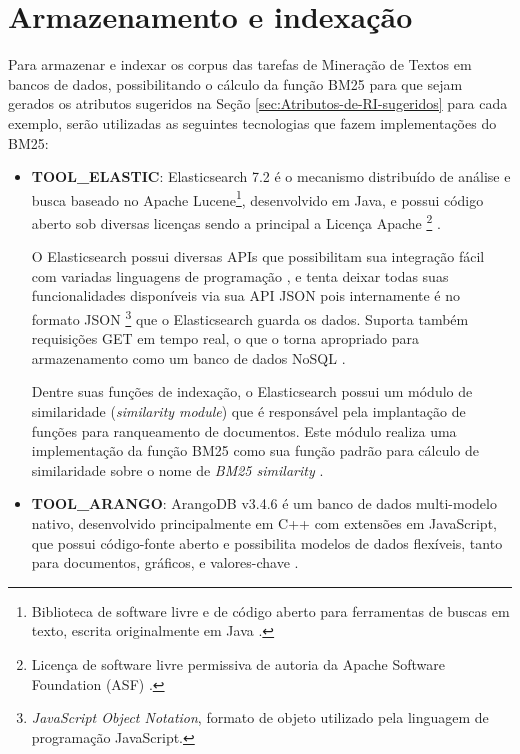     
\section{Armazenamento e indexação} \label{sec:Armazenamento-e-indexação}

    Para armazenar e indexar os corpus das tarefas de Mineração de Textos em bancos de dados, possibilitando o cálculo da função BM25 para que sejam gerados os atributos sugeridos na Seção \ref{sec:Atributos-de-RI-sugeridos} para cada exemplo, serão utilizadas as seguintes tecnologias que fazem implementações do BM25:
    \begin{itemize}
        \item \textbf{TOOL\_ELASTIC}: Elasticsearch 7.2 é o mecanismo distribuído de análise e busca baseado no Apache Lucene\footnote{Biblioteca de software livre e de código aberto para ferramentas de buscas em texto, escrita originalmente em Java \cite{LUCENE_DOCUMENTATION_2019}.}, desenvolvido em Java, e possui código aberto sob diversas licenças sendo a principal a Licença Apache
        \footnote{Licença de software livre permissiva de autoria da Apache Software Foundation (ASF) \cite{NEWMEDIA_OPENGUIDE_2015}.}
         \cite{ELASTIC_GitHub_2019, ELASTIC_REFERENCE_INTRO_2019}. 
        
        O Elasticsearch possui diversas APIs que possibilitam sua integração fácil com variadas linguagens de programação \cite{ELASTIC_GitHub_2019}, e tenta deixar todas suas funcionalidades disponíveis via sua API JSON pois internamente é no formato JSON
        \footnote{\textit{JavaScript Object Notation}, formato de objeto utilizado pela linguagem de programação JavaScript.}
         que o Elasticsearch guarda os dados. 
        Suporta também requisições GET em tempo real, o que o torna apropriado para armazenamento como um banco de dados NoSQL \cite{PETER_ELASTICDB_2011, VOLKAN_ELASTIC_DATASTORE_2018}.
        
        Dentre suas funções de indexação, o Elasticsearch possui um módulo de similaridade (\textit{similarity module}) que é responsável pela implantação de funções para ranqueamento de documentos.
        Este módulo realiza uma implementação da função BM25 como sua função padrão para cálculo de similaridade sobre o nome de \textit{BM25 similarity} \cite{ELASTIC_REFERENCE_SIMILARITY_2019}.
        
        \item \textbf{TOOL\_ARANGO}: ArangoDB v3.4.6 é um banco de dados multi-modelo nativo, desenvolvido principalmente em C++ com extensões em JavaScript, que possui código-fonte aberto e possibilita modelos de dados flexíveis, tanto para documentos, gráficos, e valores-chave \cite{ARANGODB_DOC_2019, ARANGODB_GitHub_2019}.
        

\end{itemize}
